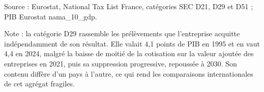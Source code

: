 Source : Eurostat, National Tax List France, catégories SEC D21, D29 et D51 ; PIB Eurostat nama\_10\_gdp.\par Note : la catégorie D29 rassemble les prélèvements que l'entreprise acquitte indépendamment de son résultat. Elle valait 4,1 points de PIB en 1995 et en vaut 4,4 en 2024, malgré la baisse de moitié de la cotisation sur la valeur ajoutée des entreprises en 2021, puis sa suppression progressive, repoussée à 2030. Son contenu diffère d'un pays à l'autre, ce qui rend les comparaisons internationales de cet agrégat fragiles.

